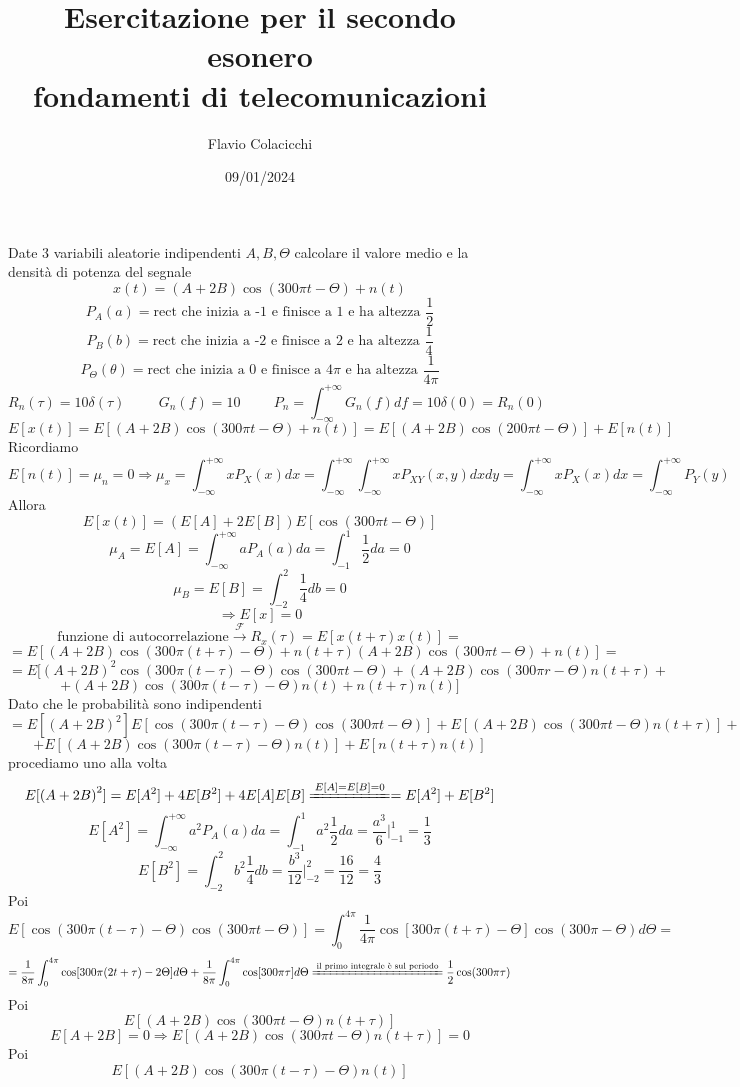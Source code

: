 \documentclass{article}
\title{Esercitazione per il secondo esonero\\\normalsize fondamenti di telecomunicazioni}
\author{Flavio Colacicchi}
\date{09/01/2024}
\newcommand{\trasformata}{\xrightarrow{\mathscr{F}}}
\begin{document}
\maketitle
Date 3 variabili aleatorie indipendenti \(A,B,\Theta\) calcolare il valore medio e la densità di potenza del segnale
\[x(t)=(A+2B)\cos(300\pi t-\Theta)+n(t)\]
\[P_A(a)=\text{rect che inizia a -1 e finisce a 1 e ha altezza }\frac{1}{2}\]
\[P_B(b)=\text{rect che inizia a -2 e finisce a 2 e ha altezza }\frac{1}{4}\]
\[P_\Theta(\theta)=\text{rect che inizia a 0 e finisce a 4$\pi$ e ha altezza }\frac{1}{4\pi}\]
\[R_n(\tau)=10\delta(\tau)\hspace{1cm}G_n(f)=10\hspace{1cm}P_n=\int_{-\infty}^{+\infty}G_n(f)df=10\delta(0)=R_n(0)\]
\[E[x(t)]=E[(A+2B)\cos(300\pi t-\Theta)+n(t)]=E[(A+2B)\cos(200\pi t-\Theta)]+E[n(t)]\]
Ricordiamo
\[E[n(t)]=\mu_n=0\Rightarrow\mu_x=\int_{-\infty}^{+\infty}xP_X(x)dx=\int_{-\infty}^{+\infty}\int_{-\infty}^{+\infty}xP_{XY}(x,y)dxdy=\int_{-\infty}^{+\infty}xP_X(x)dx=\int_{-\infty}^{+\infty}P_Y(y)\]
Allora
\[E[x(t)]=(E[A]+2E[B])E[\cos(300\pi t-\Theta)]\]
\[\mu_A=E[A]=\int_{-\infty}^{+\infty}aP_A(a)da=\int_{-1}^1\frac{1}{2}da=0\]
\[\mu_B=E[B]=\int_{-2}^2\frac{1}{4}db=0\]
\[\Rightarrow E[x]=0\]
\[\text{funzione di autocorrelazione}\trasformata R_x(\tau)=E[x(t+\tau)x(t)]=\]
\[=E[(A+2B)\cos(300\pi(t+\tau)-\Theta)+n(t+\tau)(A+2B)\cos(300\pi t-\Theta)+n(t)]=\]
\[=E[{(A+2B)}^2\cos(300\pi(t-\tau)-\Theta)\cos(300\pi t-\Theta)+(A+2B)\cos(300\pi r-\Theta)n(t+\tau)+\]
\[+(A+2B)\cos(300\pi(t-\tau)-\Theta)n(t)+n(t+\tau)n(t)]\]
Dato che le probabilità sono indipendenti
\[=E[{(A+2B)}^2]E[\cos(300\pi(t-\tau)-\Theta)\cos(300\pi t-\Theta)]+E[(A+2B)\cos(300\pi t-\Theta)n(t+\tau)]+\]
\[+E[(A+2B)\cos(300\pi(t-\tau)-\Theta)n(t)]+E[n(t+\tau)n(t)]\]
procediamo uno alla volta
\[E[{(A+2B)}^2]=E[A^2]+4E[B^2]+4E[A]E[B]\xlongequal{E[A]=E[B]=0}=E[A^2]+E[B^2]\]
\[E[A^2]=\int_{-\infty}^{+\infty}a^2P_A(a)da=\int_{-1}^1a^2\frac{1}{2}da=\frac{a^3}{6}\Big|_{-1}^1=\frac{1}{3}\]
\[E[B^2]=\int_{-2}^2b^2\frac{1}{4}db=\frac{b^3}{12}\Big|_{-2}^2=\frac{16}{12}=\frac{4}{3}\]
Poi
\[E[\cos(300\pi(t-\tau)-\Theta)\cos(300\pi t-\Theta)]=\int_0^{4\pi}\frac{1}{4\pi}\cos[300\pi(t+\tau)-\Theta]\cos(300\pi-\Theta)d\Theta=\]
\[=\frac{1}{8\pi}\int_0^{4\pi}\cos[300\pi(2t+\tau)-2\Theta]d\Theta+\frac{1}{8\pi}\int_0^{4\pi}\cos[300\pi\tau]d\Theta\xlongequal{\text{il primo integrale è sul periodo}}\frac{1}{2}\cos(300\pi\tau)\]
Poi
\[E[(A+2B)\cos(300\pi t-\Theta)n(t+\tau)]\]
\[E[A+2B]=0\Rightarrow E[(A+2B)\cos(300\pi t-\Theta)n(t+\tau)]=0\]
Poi
\[E[(A+2B)\cos(300\pi(t-\tau)-\Theta)n(t)]\]
\end{document}
